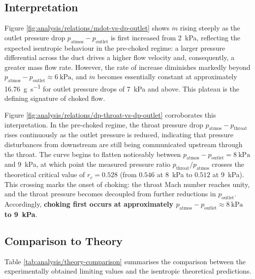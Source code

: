 \subsection{Interpretation} \label{sec:analysis/interpretation}

Figure \ref{fig:analysis/relations/mdot-vs-dp-outlet} shows \( \dot{m} \) rising steeply as the outlet pressure drop \( p_\text{atmos} - p_\text{outlet} \) is first increased from \qty{2}{\kPa}, reflecting the expected isentropic behaviour in the pre-choked regime: a larger pressure differential across the duct drives a higher flow velocity and, consequently, a greater mass flow rate. However, the rate of increase diminishes markedly beyond \( p_\text{atmos} - p_\text{outlet} \approx \qty{6}{\kPa} \), and \( \dot{m} \) becomes essentially constant at approximately \qty{16.76}{\g\per\s} for outlet pressure drops of \qty{7}{\kPa} and above. This plateau is the defining signature of choked flow.

Figure \ref{fig:analysis/relations/dp-throat-vs-dp-outlet} corroborates this interpretation. In the pre-choked regime, the throat pressure drop \( p_\text{atmos} - p_\text{throat} \) rises continuously as the outlet pressure is reduced, indicating that pressure disturbances from downstream are still being communicated upstream through the throat. The curve begins to flatten noticeably between \( p_\text{atmos} - p_\text{outlet} = \qty{8}{\kPa} \) and \qty{9}{\kPa}, at which point the measured pressure ratio \( p_\text{throat}/p_\text{atmos} \) crosses the theoretical critical value of \( r_c = 0.528 \) (from \( 0.546 \) at \qty{8}{\kPa} to \( 0.512 \) at \qty{9}{\kPa}). This crossing marks the onset of choking: the throat Mach number reaches unity, and the throat pressure becomes decoupled from further reductions in \( p_\text{outlet} \). Accordingly, \textbf{choking first occurs at approximately \( p_\text{atmos} - p_\text{outlet} \approx \qty{8}{\kPa} \) to \qty{9}{\kPa}}.

\subsection{Comparison to Theory} \label{sec:analysis/theory-comparison}

Table \ref{tab:analysis/theory-comparison} summarises the comparison between the experimentally obtained limiting values and the isentropic theoretical predictions.

